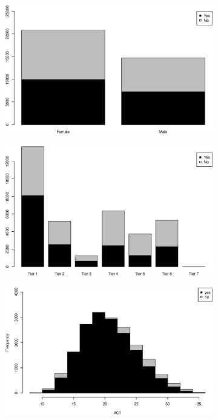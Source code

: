 \documentclass[12pt,english]{report}
\begin{document}
\begin{figure}[p] 

\begin{subfigure}{0.48\textwidth}
\includegraphics[width=\linewidth]{pic/enroll_gender}
\caption{} \label{enroll:a}
\end{subfigure}\hspace*{\fill}
\begin{subfigure}{0.48\textwidth }
\includegraphics[width=\linewidth]{pic/enroll_tier}
\caption{} \label{enroll:b}
\end{subfigure}
\medskip
\begin{subfigure}{0.48\textwidth}
\includegraphics[width=\linewidth] {pic/enroll_act}

\end{subfigure}
\end{figure}
\end{document}
